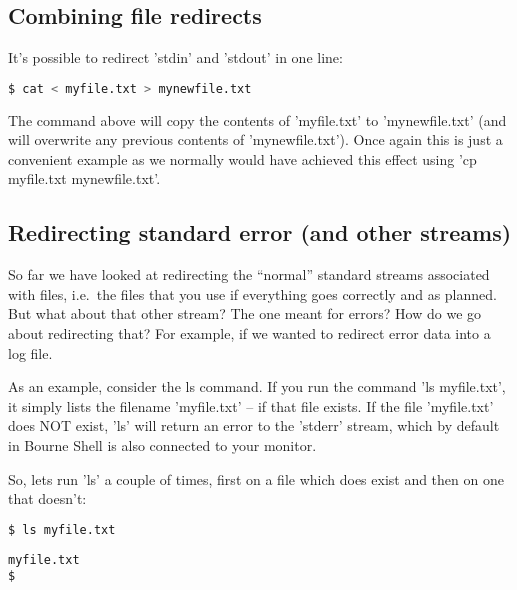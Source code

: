 \subsection{Combining file redirects}
It's possible to redirect 'stdin' and 'stdout' in one line:
\lstset{basicstyle=\scriptsize, numbers=left, captionpos=b, tabsize=4}
\begin{lstlisting}[caption=Redirecting input to and output from cat at the same time,language={bash},
breaklines=true,xleftmargin=15pt,label=lst:Redirecting input to and output from cat at the same time]
$ cat < myfile.txt > mynewfile.txt
\end{lstlisting}

The command above will copy the contents of 'myfile.txt' to 'mynewfile.txt'
(and will overwrite any previous contents of 'mynewfile.txt'). Once again this
is just a convenient example as we normally would have achieved this effect
using 'cp myfile.txt mynewfile.txt'.

\subsection{Redirecting standard error (and other streams)}
So far we have looked at redirecting the ``normal'' standard streams associated
with files, i.e.\ the files that you use if everything goes correctly and as
planned. But what about that other stream? The one meant for errors? How do we
go about redirecting that? For example, if we wanted to redirect error data
into a log file.

As an example, consider the ls command. If you run the command 'ls myfile.txt',
it simply lists the filename 'myfile.txt' -- if that file exists. If the file
'myfile.txt' does NOT exist, 'ls' will return an error to the 'stderr' stream,
which by default in Bourne Shell is also connected to your monitor.

So, lets run 'ls' a couple of times, first on a file which does exist and then
on one that doesn't:
\lstset{basicstyle=\scriptsize, numbers=left, captionpos=b, tabsize=4}
\begin{lstlisting}[caption=Listing an existing file,language={bash},
breaklines=true,xleftmargin=15pt,label=lst:Listing an existing file]
$ ls myfile.txt
\end{lstlisting}

\scriptsize
\begin{verbatim}
myfile.txt
$
\end{verbatim}
\normalsize

